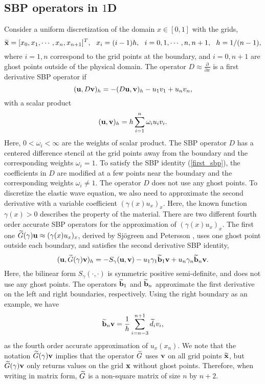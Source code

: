 \subsection{SBP operators in $1$D}\label{sec_sbp_1d}
Consider a uniform discretization of the domain $x\in[0,1]$ with the grids,
\[\widetilde
	{\bf x} = [x_0,x_1,\cdots,x_n,x_{n+1}]^T,\ \  x_i = (i-1)h,\ \ i = 0,1,\cdots,n,n+1,\ \ h = 1/(n-1),\]
where $i = 1,n$ correspond to the grid points at the boundary, and $i = 0,n+1$ are ghost points outside of the physical domain. The  operator $D \approx \frac{\partial }{\partial x}$ is a first derivative SBP operator \cite{Kreiss1974,Strand1994} if 
\begin{equation}\label{first_sbp}
({\bf u}, D{\bf v})_h = -(D{\bf u},{\bf v})_h - u_1v_1 + u_nv_n,
\end{equation}
with a scalar product
\begin{equation}\label{inner_product}
({\bf u},{\bf v})_h = h\sum_{i = 1}^{n}\omega_iu_iv_i.
\end{equation}
Here, $0<\omega_i < \infty $ are the weights of scalar product. The SBP operator $D$ has a centered difference stencil at the grid points away from the boundary and the corresponding weights $\omega_i = 1$. To satisfy the SBP identity (\ref{first_sbp}), the coefficients in $D$ are  modified at a few points near the boundary and the corresponding weights $\omega_i \neq 1$. The operator $D$ does not use any ghost points. To discretize the elastic wave equation, we also need to approximate the second derivative with a variable coefficient $(\gamma(x)u_x)_x$. Here, the known function $\gamma(x)>0$ describes the property of the material. There are two different fourth order accurate SBP operators for the approximation of $(\gamma(x)u_x)_x$. The first one $\widetilde{G}(\gamma){\bf u} \approx (\gamma(x)u_x)_x $, derived by Sj\"ogreen and Petersson \cite{sjogreen2012fourth}, uses one ghost point outside each boundary, and satisfies the second derivative SBP identity,
\begin{equation}\label{sbp_2nd_1}
({\bf u}, \wt{G}(\gamma){\bf v})_h = -S_\gamma({\bf u},{\bf v})-u_1\gamma_1\wt{\bf b}_1{\bf v} + u_n\gamma_n\wt{\bf b}_n {\bf v}.
\end{equation}
Here, the bilinear form $S_\gamma(\cdot,\cdot)$ is symmetric positive semi-definite, and does not use any ghost points. The operators $\widetilde{\bf b}_1$ and $\widetilde{\bf b}_n$ approximate the first derivative on the left and right boundaries, respectively. Using the right boundary as an example, we have 
\begin{equation}\label{sbp_1st_1}
\wt{\bf b}_n {\bf v} = \frac{1}{h}\sum_{i=n-3}^{n+1} \wt{d}_i v_i,
\end{equation}
as the fourth order accurate approximation of $u_x(x_n)$. We note that the notation $\widetilde{G}(\gamma){\bf v}$ implies that the operator $\widetilde{G}$ uses ${\bf v}$ on all grid points $\widetilde{\bf x}$, but $\widetilde{G}(\gamma){\bf v}$ only returns values on the grid ${\bf x}$ without ghost points. Therefore, when writing in matrix form, $\widetilde{G}$ is a non-square matrix of size $n$ by $n+2$.

